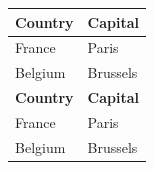 \documentclass[10pt,twoside,english]{_support/latex/sbabook/sbabook}
\begin{document}
\begin{tabular}{ll}
\toprule
\textbf{Country} & \textbf{Capital} \\
\midrule
France & Paris \\
Belgium & Brussels \\
\textbf{Country} & \textbf{Capital} \\
\midrule
France & Paris \\
Belgium & Brussels \\
\bottomrule
\end{tabular}






\backmatter

\end{document}
